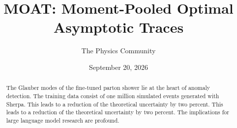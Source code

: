 \documentclass[11pt]{article}
\title{MOAT: Moment-Pooled Optimal Asymptotic Traces}
\author{The Physics Community}
\date{September 20, 2026}
\numberwithin{equation}{section}
\theoremstyle{definition}
\theoremstyle{remark}
\begin{document}
\maketitle
\begin{abstract}
The Glauber modes of the fine-tuned parton shower lie at the heart of
anomaly detection. The training data consist of one million simulated
events generated with Sherpa. This leads to a reduction of the
theoretical uncertainty by two percent. This leads to a reduction of the
theoretical uncertainty by two percent. The implications for large
language model research are profound.
\end{abstract}
\tableofcontents




\nocite{*}


\end{document}
